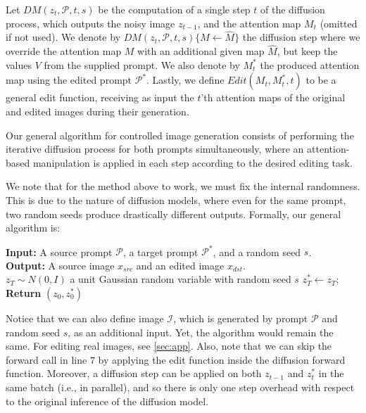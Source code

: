 Let $DM(z_t,\mathcal{P},t,s)$  be the computation of a single step $t$ of the diffusion process, which outputs the noisy image $z_{t-1}$, and the attention map $M_{t}$ (omitted if not used). We denote by $DM(z_t,\mathcal{P},t,s)\{M\gets \widehat{M}\}$ the diffusion step where we override the attention map $M$ with an additional given map $\widehat{M}$, but keep the values $V$ from the supplied prompt. We also denote by $M_{t}^*$ the produced attention map using the edited prompt $\mathcal{P}^*$.
Lastly, we define $Edit(M_t, M_t^*, t)$ to be a general edit function, receiving as input the $t$'th attention maps of the original and edited images during their generation. 

Our general algorithm for controlled image generation consists of performing the iterative diffusion process for both prompts simultaneously, where an attention-based manipulation is applied in each step according to the desired editing task. 

We note that for the method above to work, we must fix the internal randomness. This is due to the nature of diffusion models, where even for the same prompt, two random seeds produce drastically different outputs. Formally, our general algorithm is:

\begin{algorithm}[H]\label{alg:attentionplease}
\SetAlgoLined
\textbf{Input:} A source prompt $\mathcal{P}$, a target prompt $\mathcal{P}^*$, and a random seed $s$.\\
\textbf{Output:} A source image $x_{src}$ and an edited image $x_{dst}$.\\

 $z_{T} \sim N(0,I)$ a unit Gaussian random variable with random seed $s$\; 
 $z_{T}^* \gets z_{T}$; \\
 \textbf{Return} $(z_{0},z_{0}^*)$
 \caption{Prompt-to-Prompt image editing}

\end{algorithm}

Notice that we can also define image $\mathcal{I}$, which is generated by prompt $\mathcal{P}$ and random seed $s$, as an additional input. Yet, the algorithm would remain the same. For editing real images, see \ref{sec:app}. 
Also, note that we can skip the forward call in line $7$ by applying the edit function inside the diffusion forward function. Moreover, a diffusion step can be applied on both $z_{t-1}$ and $z_{t}^*$ in the same batch (i.e., in parallel), and so there is only one step overhead with respect to the original inference of the diffusion model.  


